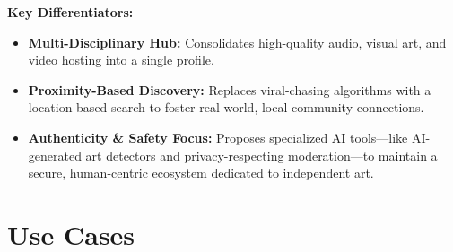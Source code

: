 \documentclass[11pt]{report}
\newcommand{\fillin}[1]{\textcolor{gray!70}{\emph{[#1]}}}
\begin{document}
\textbf{Key Differentiators:}
\begin{itemize}
  \item \textbf{Multi-Disciplinary Hub:} Consolidates high-quality audio, visual art, and video hosting into a single profile.
  \item \textbf{Proximity-Based Discovery:} Replaces viral-chasing algorithms with a location-based search to foster real-world, local community connections.
  \item \textbf{Authenticity \& Safety Focus:} Proposes specialized AI tools—like AI-generated art detectors and privacy-respecting moderation—to maintain a secure, human-centric ecosystem dedicated to independent art.
\end{itemize}



\chapter{Use Cases}


\end{document}
